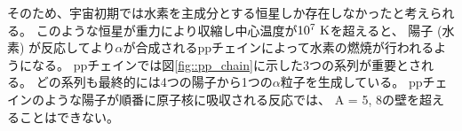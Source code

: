 そのため、宇宙初期では水素を主成分とする恒星しか存在しなかったと考えられる。
このような恒星が重力により収縮し中心温度が$10^7~{\rm K}$を超えると、
陽子 (水素) が反応してより$\alpha$が合成されるppチェインによって水素の燃焼が行われるようになる。
ppチェインでは図\ref{fig::pp_chain}に示した3つの系列が重要とされる。
どの系列も最終的には4つの陽子から1つの$\alpha$粒子を生成している。
ppチェインのような陽子が順番に原子核に吸収される反応では、
A = 5, 8の壁を超えることはできない。
